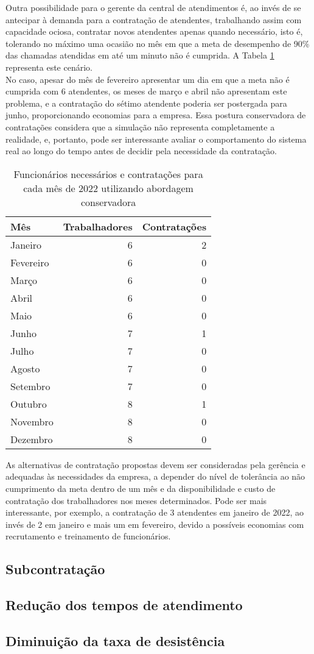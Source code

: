 Outra possibilidade para o gerente da central de atendimentos é, ao invés de se antecipar à demanda para a contratação de atendentes, trabalhando assim com capacidade ociosa, contratar novos atendentes apenas quando necessário, isto é, tolerando no máximo uma ocasião no mês em que a meta de desempenho de 90\% das chamadas atendidas em até um minuto não é cumprida. A Tabela \ref*{tab: funcionarios-2022-economico} representa este cenário.\\
No caso, apesar do mês de fevereiro apresentar um dia em que a meta não é cumprida com 6 atendentes, os meses de março e abril não apresentam este problema, e a contratação do sétimo atendente poderia ser postergada para junho, proporcionando economias para a empresa. Essa postura conservadora de contratações considera que a simulação não representa completamente a realidade, e, portanto, pode ser interessante avaliar o comportamento do sistema real ao longo do tempo antes de decidir pela necessidade da contratação. 

\begin{table}[H]
    \centering
    \begin{tabular}{|l|r|r|}
    \hline
    \textbf{Mês} & \multicolumn{1}{l|}{\textbf{Trabalhadores}} & \multicolumn{1}{l|}{\textbf{Contratações}} \\ \hline
    Janeiro & 6 & 2 \\ \hline
    Fevereiro & 6 & 0 \\ \hline
    Março & 6 & 0 \\ \hline
    Abril & 6 & 0 \\ \hline
    Maio & 6 & 0 \\ \hline
    Junho & 7 & 1 \\ \hline
    Julho  & 7 & 0 \\ \hline
    Agosto & 7 & 0 \\ \hline
    Setembro & 7 & 0 \\ \hline
    Outubro & 8 & 1 \\ \hline
    Novembro & 8 & 0 \\ \hline
    Dezembro & 8 & 0 \\ \hline
    \end{tabular}
    \caption{Funcionários necessários e contratações para cada mês de 2022 utilizando abordagem conservadora}
    \label{tab: funcionarios-2022-economico}
    \end{table}

As alternativas de contratação propostas devem ser consideradas pela gerência e adequadas às necessidades da empresa, a depender do nível de tolerância ao não cumprimento da meta dentro de um mês e da disponibilidade e custo de contratação dos trabalhadores nos meses determinados. Pode ser mais interessante, por exemplo, a contratação de 3 atendentes em janeiro de 2022, ao invés de 2 em janeiro e mais um em fevereiro, devido a possíveis economias com recrutamento e treinamento de funcionários.

\subsection{Subcontratação}
\subsection{Redução dos tempos de atendimento}
\subsection{Diminuição da taxa de desistência}

